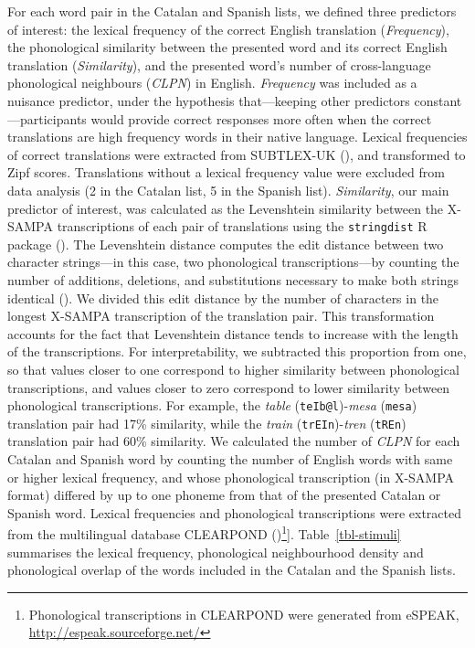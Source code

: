 \documentclass[
]{article}
\begin{document}
For each word pair in the Catalan and Spanish lists, we defined three
predictors of interest: the lexical frequency of the correct English
translation (\emph{Frequency}), the phonological similarity between the
presented word and its correct English translation (\emph{Similarity}),
and the presented word's number of cross-language phonological
neighbours (\emph{CLPN}) in English. \emph{Frequency} was included as a
nuisance predictor, under the hypothesis that---keeping other predictors
constant---participants would provide correct responses more often when
the correct translations are high frequency words in their native
language. Lexical frequencies of correct translations were extracted
from SUBTLEX-UK (), and transformed to Zipf scores. Translations without a lexical
frequency value were excluded from data analysis (2 in the Catalan list,
5 in the Spanish list). \emph{Similarity}, our main predictor of
interest, was calculated as the Levenshtein similarity between the
X-SAMPA transcriptions of each pair of translations using the
\texttt{stringdist} R package (). The Levenshtein distance computes the edit distance between
two character strings---in this case, two phonological
transcriptions---by counting the number of additions, deletions, and
substitutions necessary to make both strings identical
(). We divided
this edit distance by the number of characters in the longest X-SAMPA
transcription of the translation pair. This transformation accounts for
the fact that Levenshtein distance tends to increase with the length of
the transcriptions. For interpretability, we subtracted this proportion
from one, so that values closer to one correspond to higher similarity
between phonological transcriptions, and values closer to zero
correspond to lower similarity between phonological transcriptions. For
example, the \emph{table} (\texttt{teIb@l})-\emph{mesa} (\texttt{mesa})
translation pair had 17\% similarity, while the \emph{train}
(\texttt{trEIn})-\emph{tren} (\texttt{tREn}) translation pair had 60\%
similarity. We calculated the number of \emph{CLPN} for each Catalan and
Spanish word by counting the number of English words with same or higher
lexical frequency, and whose phonological transcription (in X-SAMPA
format) differed by up to one phoneme from that of the presented Catalan
or Spanish word. Lexical frequencies and phonological transcriptions
were extracted from the multilingual database CLEARPOND
()\footnote{Phonological
  transcriptions in CLEARPOND were generated from eSPEAK,
  \url{http://espeak.sourceforge.net/}}{]}. Table~\ref{tbl-stimuli}
summarises the lexical frequency, phonological neighbourhood density and
phonological overlap of the words included in the Catalan and the
Spanish lists.
\end{document}
